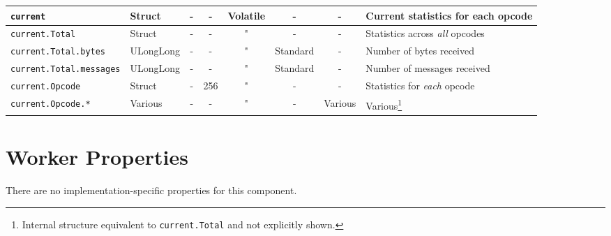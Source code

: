 \documentclass{article}
\begin{document}
\begin{landscape}
\begin{scriptsize}
\begin{minipage}{\textwidth}
\begin{tabular}{|p{3cm}|p{1.5cm}|c|c|c|c|c|p{7cm}|}
				\hline
				\verb+current+                & Struct    & -                       & -               & Volatile          & -            & -       & Current statistics for each opcode                                                                                                                                                \\
				\hline
				\verb+current.Total+          & Struct    & -                       & -               & "                 & -            & -       & Statistics across \textit{all} opcodes                                                                                                                                            \\
				\hline
				\verb+current.Total.bytes+    & ULongLong & -                       & -               & "                 & Standard     & -       & Number of bytes received                                                                                                                                                          \\
				\hline
				\verb+current.Total.messages+ & ULongLong & -                       & -               & "                 & Standard     & -       & Number of messages received                                                                                                                                                       \\
				\hline
				\verb+current.Opcode+         & Struct    & -                       & 256             & "                 & -            & -       & Statistics for \textit{each} opcode                                                                                                                                               \\
				\hline
				\verb+current.Opcode.*+       & Various   & -                       & -               & "                 & -            & Various & Various\footnote{Internal structure equivalent to \texttt{current.Total} and not explicitly shown.}                                                                               \\
				\hline
			\end{tabular}
		\end{minipage}
	\end{scriptsize}
	\section*{Worker Properties}
	There are no implementation-specific properties for this component.


\end{landscape}
\end{document}
